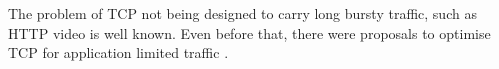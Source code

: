 \documentclass[10pt,sigconf]{acmart}
\begin{document}








The problem of TCP not being designed to carry long bursty traffic, such as HTTP video is well known. Even before that, there were proposals to optimise TCP for application limited traffic \cite{rfc2861-2000-padhye-congestion-window-validation}.
\end{document}
